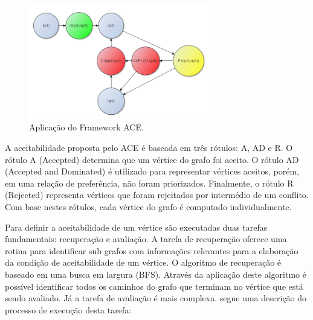 \graphicspath{{figuras/}}
\begin{figure}[H]
\centering
\includegraphics[width=0.7\textwidth]{grafo_ace}
\caption{Aplicação do Framework ACE.} 
\label{aplicacao_framework_ace}
\end{figure}

A aceitabilidade proposta pelo ACE é baseada em três rótulos: A, AD e R. O rótulo A (Accepted) determina que um vértice do grafo foi aceito. O rótulo AD (Accepted and Dominated) é utilizado para representar vértices aceitos, porém, em uma relação de preferência, não foram priorizados. Finalmente, o rótulo R (Rejected) representa vértices que foram rejeitados por intermédio de um conflito. Com base nestes rótulos, cada vértice do grafo é computado individualmente.

Para definir a aceitabilidade de um vértice são executadas duas tarefas fundamentais: recuperação e avaliação. A tarefa de recuperação oferece uma rotina para identificar sub grafos com informações relevantes para a elaboração da condição de aceitabilidade de um vértice. O algoritmo de recuperação é baseado em uma busca em largura (BFS). Através da aplicação deste algoritmo é possível identificar todos os caminhos do grafo que terminam no vértice que está sendo avaliado. Já a tarefa de avaliação é mais complexa. segue uma descrição do processo de execução desta tarefa:

